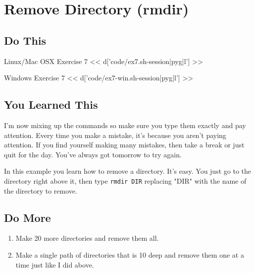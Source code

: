 \chapter{Remove Directory (rmdir)}

\section{Do This}

\begin{code}{Linux/Mac OSX Exercise 7}
<< d['code/ex7.sh-session|pyg|l'] >>
\end{code}

\begin{code}{Windows Exercise 7}
<< d['code/ex7-win.sh-session|pyg|l'] >>
\end{code}

\section{You Learned This}

I'm now mixing up the commands so make sure you type them exactly and pay attention.
Every time you make a mistake, it's because you aren't paying attention.  If you
find yourself making many mistakes, then take a break or just quit for the day.
You've always got tomorrow to try again.

In this example you learn how to remove a directory.  It's easy. You just
go to the directory right above it, then type \verb|rmdir DIR| replacing "DIR"
with the name of the directory to remove.

\section{Do More}

\begin{enumerate}
\item Make 20 more directories and remove them all.
\item Make a single path of directories that is 10 deep and remove them one at a
    time just like I did above.
\end{enumerate}

